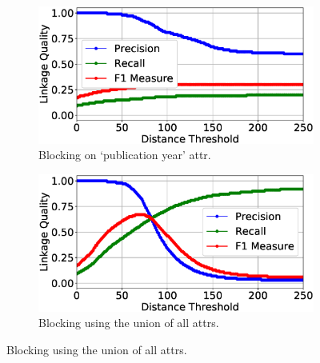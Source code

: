 \documentclass{llncs}
\begin{document}
\begin{figure}
\begin{subfigure}{.5\textwidth}
  \centering
\includegraphics[width=\textwidth]{figures/plotLQ-cora-trad-year}
\vspace{-6mm}
\caption{Blocking on `publication year' attr.}
\end{subfigure}%
\begin{subfigure}{.5\textwidth}
  \centering
\includegraphics[width=\textwidth]{figures/plotLQ-cora-trad-combined}
\vspace{-6mm}
\caption{Blocking using the union of all attrs.}
\end{subfigure} \vspace{5mm}


\end{figure}
\end{document}
